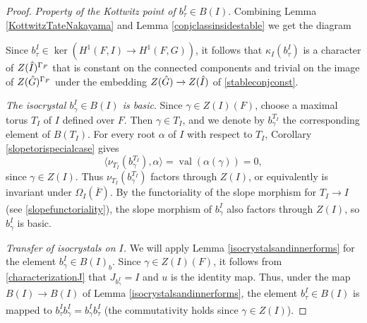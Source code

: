 \documentclass[11pt,a4paper]{article}
\theoremstyle{definition}
\theoremstyle{plain}
\theoremstyle{remark}
\theoremstyle{plain}
\DeclareMathOperator{\val}{val}
\begin{document}
\begin{proof}
    
    \textit{Property of the Kottwitz point of $b_{\tau}^I \in B(I)$}. Combining Lemma \ref{KottwitzTateNakayama} and Lemma \ref{conjclassinsidestable} we get the diagram
    \begin{center}
    \end{center}
    Since $b_{\tau}^I \in \ker(H^1(F,I) \xrightarrow[]{} H^1(F,G))$, it follows that $\kappa_I(b_{\tau}^I)$ is a character of $Z(\Hat{I})^{\Gamma_F}$ that is constant on the connected components and trivial on the image of $Z(\Hat{G})^{\Gamma_F}$ under the embedding $Z(\Hat{G}) \xrightarrow[]{} Z(\Hat{I})$ of \ref{stableconjconst}.

    \textit{The isocrystal $b_{\gamma}^I \in B(I)$ is basic}. Since $\gamma \in Z(I)(F)$, choose a maximal torus $T_I$ of $I$ defined over $F$. Then $\gamma \in T_I$, and we denote by $b_{\gamma}^{T_I}$ the corresponding element of $B(T_I)$. For every root $\alpha$ of $I$ with respect to $T_I$, Corollary \ref{slopetorispecialcase} gives
    $$\langle \nu_{T_I}(b_{\gamma}^{T_I}),\alpha\rangle=\val(\alpha(\gamma))=0,$$
    since $\gamma \in Z(I)$. Thus $\nu_{T_I}(b_{\gamma}^{T_I})$ factors through $Z(I)$, or equivalently is invariant under $\Omega_I(\overline{F})$. By the functoriality of the slope morphism for $T_I \xrightarrow[]{} I$ (see \ref{slopefunctoriality}), the slope morphism of $b_{\gamma}^I$ also factors through $Z(I)$, so $b_{\gamma}^I$ is basic.

    \textit{Transfer of isocrystals on $I$.} We will apply Lemma \ref{isocrystalsandinnerforms} for the element $b_{\gamma}^I \in B(I)_b$. Since $\gamma \in Z(I)(F)$, it follows from \ref{characterizationJ} that $J_{b_{\gamma}^I} = I$ and $u$ is the identity map. Thus, under the map $B(I) \xrightarrow[]{} B(I)$ of Lemma \ref{isocrystalsandinnerforms}, the element $b_{\tau}^I \in B(I)$ is mapped to $b_{\tau}^I b_{\gamma}^I = b_{\gamma}^Ib_{\tau}^I$ (the commutativity holds since $\gamma \in Z(I)$).
    

\end{proof}
\end{document}
